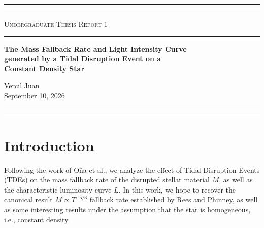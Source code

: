 \documentclass[10pt,a4paper]{article}
\begin{document}
	\begin{center}
	  {\Large
		\hrule\vspace{3pt}\hrule\vspace{0.5em}
		\textsc{Undergraduate Thesis Report 1}\vspace{1em}
		\hrule\vspace{1em}
		\textbf{
		  The Mass Fallback Rate and Light Intensity Curve\\
		  generated by a Tidal Disruption Event on a\\
		  Constant Density Star\\[0.5cm]
		}
	  }
	  {\large
		Vercil Juan\\[1em]
		September 10, 2026\vspace{1em}
		\hrule\vspace{3pt}
		\hrule\vspace{0.5cm}
	  }
	\end{center}

	\section{Introduction}
		Following the work of O\~na et al.\cite{Ona2026}, we analyze the effect of Tidal 
		Disruption Events (TDEs) on the mass fallback rate of the disrupted 
		stellar material $\dot M$, as well as the characteristic luminosity curve
		$L$. In this work, we hope to recover the canonical result $\dot M \propto T^{-5/3}$
		fallback rate established by Rees\cite{Rees1988} and Phinney\cite{Phinney1989}, as well as some interesting results under the assumption that the 
		star is homogeneous, i.e., constant density.   

\end{document}
